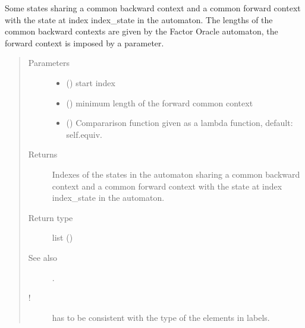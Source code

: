 \documentclass[letterpaper,10pt,english]{sphinxmanual}
\begin{document}
\begin{fulllineitems}
\begin{fulllineitems}
\end{fulllineitems}


\begin{fulllineitems}
\label{\detokenize{index:Model.FactorOracle.similar_contexts}}
Some states sharing a common backward context and a common forward context with the state at index index\_state in the automaton. 
The lengths of the common backward contexts are given by the Factor Oracle automaton, the forward context is imposed by a parameter.
\begin{quote}\begin{description}
\item[{Parameters}] \leavevmode\begin{itemize}
\item {} 
 () \textendash{} start index

\item {} 
 () \textendash{} minimum length of the forward common context

\item {} 
 () \textendash{} Compararison function given as a lambda function, default: self.equiv.

\end{itemize}

\item[{Returns}] \leavevmode
Indexes of the states in the automaton sharing a common backward context and a common forward context with the state at index index\_state in the automaton.

\item[{Return type}] \leavevmode
list ()

\item[{See also}] \leavevmode
{} .

\item[{!}] \leavevmode
{} has to be consistent with the type of the elements in labels.


\end{description}
\end{quote}
\end{fulllineitems}
\end{fulllineitems}
\end{document}

